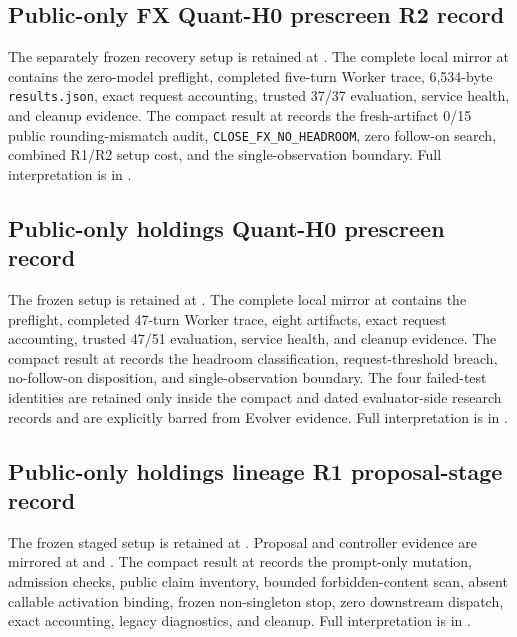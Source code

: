 \subsection{Public-only FX Quant-H0 prescreen R2 record}

The separately frozen recovery setup is retained at
. The complete
local mirror at
 contains
the zero-model preflight, completed five-turn Worker trace, 6,534-byte
\texttt{results.json}, exact request accounting, trusted 37/37 evaluation,
service health, and cleanup evidence. The compact result at
 records the
fresh-artifact 0/15 public rounding-mismatch audit,
\texttt{CLOSE\_FX\_NO\_HEADROOM}, zero follow-on search, combined R1/R2 setup
cost, and the single-observation boundary. Full interpretation is in
.

\subsection{Public-only holdings Quant-H0 prescreen record}

The frozen setup is retained at
. The complete
local mirror at
contains the preflight, completed 47-turn Worker trace, eight artifacts, exact
request accounting, trusted 47/51 evaluation, service health, and cleanup
evidence. The compact result at
 records the
headroom classification, request-threshold breach, no-follow-on disposition,
and single-observation boundary. The four failed-test identities are retained
only inside the compact and dated evaluator-side research records and are
explicitly barred from Evolver evidence. Full interpretation is in
.

\subsection{Public-only holdings lineage R1 proposal-stage record}

The frozen staged setup is retained at
. Proposal and
controller evidence are mirrored at
 and
.
The compact result at
records the prompt-only mutation, admission checks, public claim inventory,
bounded forbidden-content scan, absent callable activation binding, frozen
non-singleton stop, zero downstream dispatch, exact accounting, legacy
diagnostics, and cleanup. Full interpretation is in
.

